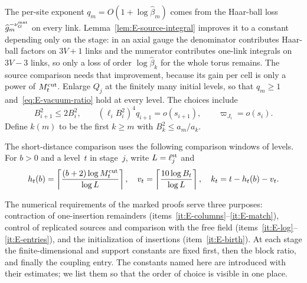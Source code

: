 The per-site exponent $q_m=O(1+\log\widehat\beta_m)$ comes from the Haar-ball loss $\widehat g_m^{-\nu_G^{\rm mat}}$ on every link. Lemma~\ref{lem:E-source-integral} improves it to a constant depending only on the stage: in an axial gauge the denominator contributes Haar-ball factors on $3V+1$ links and the numerator contributes one-link integrals on $3V-3$ links, so only a loss of order $\log\widehat\beta_k$ for the whole torus remains. The source comparison needs that improvement, because its gain per cell is only a power of $M^{\mathrm{cut}}_t$. Enlarge $Q_j$ at the finitely many initial levels, so that $q_m\ge1$ and~\eqref{eq:E-vacuum-ratio} hold at every level. The choices include
\begin{equation}\label{eq:E-marker-scales}
 B_{i+1}^2\le2B_i^2,\qquad (\ell_iB_i^2)^4q_{i+1}=o(s_{i+1}),\qquad
 \varpi_{J_i}=o(s_i).
\end{equation}
Define $k(m)$ to be the first $k\ge m$ with $B_k^2\le a_m/a_k$.

The short-distance comparison uses the following comparison windows of levels. For $b>0$ and a level~$t$ in stage~$j$, write $L=\ell_j^{\rm st}$ and
\begin{equation}\label{eq:E-window}
 h_t(b)=\left\lceil\frac{(b+2)\log M^{\mathrm{cut}}_t}{\log L}\right\rceil,
 \quad v_t=\left\lceil\frac{10\log B_t}{\log L}\right\rceil,
 \quad k_t=t-h_t(b)-v_t.
\end{equation}

The numerical requirements of the marked proofs serve three purposes: contraction of one-insertion remainders (items~\ref{it:E-columns}--\ref{it:E-match}), control of replicated sources and comparison with the free field (items~\ref{it:E-log}--\ref{it:E-entries}), and the initialization of insertions (item~\ref{it:E-birth}). At each stage the finite-dimensional and support constants are fixed first, then the block ratio, and finally the coupling entry. The constants named here are introduced with their estimates; we list them so that the order of choice is visible in one place.

